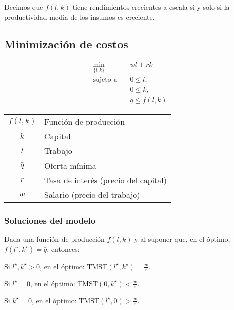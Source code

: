 \documentclass[8pt,a4paper]{extarticle}
\begin{document}
\begin{multicols}{3}
\begin{boxprop}                                                                                                                                  
    Decimos que $f(l, k)$ tiene rendimientos crecientes a escala si y solo si la productividad media de los insumos es creciente.        
\end{boxprop}

\newpage

\subsection{Minimización de costos}

\begin{equation*}
\begin{aligned}
    \min_{\{l, k\}}\      & wl + rk \\
    \text{sujeto a} \quad & 0 \le l, \\
                        ¦ & 0 \le k, \\
						¦ & \bar{q} \le f(l, k).
\end{aligned}
\end{equation*}

\begin{center}
\begin{tabular}{ c l }
    \hline
	$f(l, k)$ & Función de producción \\
    $k$ & Capital \\
    $l$ & Trabajo \\
	$\bar{q}$ & Oferta mínima \\
	$r$ & Tasa de interés (precio del capital) \\
	$w$ & Salario (precio del trabajo) \\
    \hline
\end{tabular}
\end{center}

\subsubsection*{Soluciones del modelo}

Dada una función de producción $f(l, k)$ y al suponer que, en el óptimo, $f(l^\star, k^\star) = \bar{q}$, entonces:

\begin{bulletlist}
\item Si $l^\star, k^\star > 0$, en el óptimo: $\displaystyle \text{TMST} (l^\star, k^\star) = \frac{w}{r}$.
\item Si $l^\star = 0$, en el óptimo: $\displaystyle \text{TMST} \left(0, k^\star \right) < \frac{w}{r}$.
\item Si $k^\star = 0$, en el óptimo: $\displaystyle \text{TMST} \left(l^\star , 0\right) > \frac{w}{r}$.
\end{bulletlist}


\end{multicols}
\end{document}
